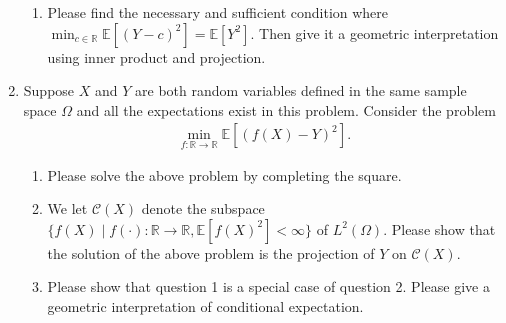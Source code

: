 \documentclass[11pt,letter,notitlepage]{article}
\begin{document}
\begin{exercise}
\begin{enumerate}
\begin{enumerate}
                \item Please find the necessary and sufficient condition where $\min_{c\in \mathbb{R}}\mathbb{E}[(Y-c)^2]=\mathbb{E}[Y^2]$. Then give it a geometric interpretation using inner product and projection.
            \end{enumerate}

            \item Suppose $X$ and $Y$ are both random variables defined in the same sample space $\Omega$ and all the expectations exist in this problem. Consider the problem
            \begin{align*}
                \min_{f:\mathbb{R}\to\mathbb{R}}\mathbb{E}[(f(X)-Y)^2].
            \end{align*}
            \begin{enumerate}
                \item Please solve the above problem by completing the square.
                \item We let $\mathcal{C}(X)$ denote the subspace $\{f(X)\mid f(\cdot):\mathbb{R}\to\mathbb{R}, \mathbb{E}[f(X)^2]<\infty \}$ of $L^2(\Omega)$. Please show that the solution of the above problem is the projection of $Y$ on $\mathcal{C}(X)$.
                \item Please show that question 1 is a special case of question 2. Please give a geometric interpretation of conditional expectation.  
            \end{enumerate}
        \end{enumerate}
    \end{exercise}	

\newpage
\end{document}
